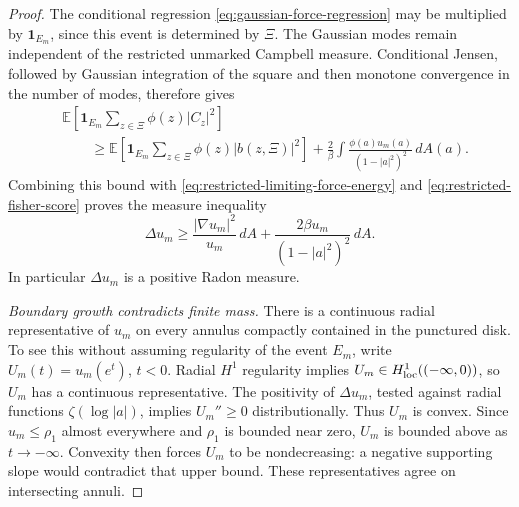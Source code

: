 \documentclass[11pt,a4paper]{article}
\numberwithin{equation}{section}
\theoremstyle{definition}
\theoremstyle{remark}
\newcommand{\E}{\mathbb E}
\begin{document}
\begin{proof}
The conditional regression
\eqref{eq:gaussian-force-regression} may be multiplied by
$\mathbf1_{E_m}$, since this event is determined by $\Xi$.
The Gaussian modes remain independent of the restricted unmarked
Campbell measure. Conditional Jensen, followed by Gaussian integration
of the square and then monotone convergence in the number of modes,
therefore gives
\begin{align*}
 &\E\left[\mathbf1_{E_m}
                  \sum_{z\in\Xi}\phi(z)|C_z|^2\right]\\
 &\qquad\ge
 \E\left[\mathbf1_{E_m}
                  \sum_{z\in\Xi}\phi(z)|b(z,\Xi)|^2\right]
       +\frac2\beta\int\frac{\phi(a)u_m(a)}{(1-|a|^2)^2}\,dA(a).
\end{align*}
Combining this bound with
\eqref{eq:restricted-limiting-force-energy} and
\eqref{eq:restricted-fisher-score} proves the measure inequality
\begin{equation}\label{eq:restricted-intensity-curvature}
 \Delta u_m\ge\frac{|\nabla u_m|^2}{u_m}\,dA
                    +\frac{2\beta u_m}{(1-|a|^2)^2}\,dA.
\end{equation}
In particular $\Delta u_m$ is a positive Radon measure.

\medskip\noindent
\emph{Boundary growth contradicts finite mass.}
There is a continuous radial representative of $u_m$ on every annulus
compactly contained in the punctured disk. To see this without assuming
regularity of the event $E_m$, write $U_m(t)=u_m(e^t)$, $t<0$.
Radial $H^1$ regularity implies $U_m\in H^1_{\rm loc}(( -\infty,0))$,
so $U_m$ has a continuous representative. The positivity of
$\Delta u_m$, tested against radial functions $\zeta(\log|a|)$,
implies $U_m''\ge0$ distributionally. Thus $U_m$ is convex.
Since $u_m\le\rho_1$ almost everywhere and $\rho_1$ is bounded near
zero, $U_m$ is bounded above as $t\to-\infty$. Convexity then forces
$U_m$ to be nondecreasing: a negative supporting slope would contradict
that upper bound. These representatives agree on intersecting annuli.


\end{proof}
\end{document}
